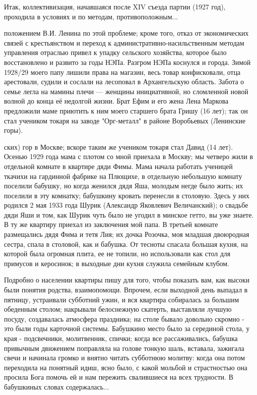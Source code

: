 \label{146-2}
Итак, коллективизация, начавшаяся после XIV съезда партии (1927 год), проходила в условиях и по методам, противоположным...

\label{147-1}
положением В.И. Ленина по этой проблеме; кроме того, отказ от экономических связей с крестьянством и переход к административно-насильственным методам управления отраслью привел к упадку сельского хозяйства, которое было восстановлено и развито за годы НЭПа. Разгром НЭПа коснулся и города. Зимой 1928/29 моего папу лишили права на магазин, весь товар конфисковали, отца арестовали, судили и сослали на лесоповал в Архангельскую область. Забота о семье легла на мамины плечи — женщины инициативной, но сломленной новой волной до конца её недолгой жизни. Брат Ефим и его жена Лена Маркова предложили маме приютить к ним моего старшего брата Гришу (16 лет); так он стал учеником токаря на заводе "Орг-металл" в районе Воробьевых (Ленинские горы).

\label{148-1}

ских) гор в Москве; вскоре таким же учеником токаря стал Давид (14 лет). Осенью 1929 года мама с плотом со мной приехала в Москву; мы четверо жили в отдельной комнате в квартире дяди Фимы. Мама начала работать ученицей ткачихи на гардинной фабрике на Плющихе, в отдельную небольшую комнату поселили бабушку, но когда женился дядя Яша, молодым негде было жить; их поселили в эту комнатку; бабушкину кровать перенесли в столовую. Здесь у них родился 2 мая 1933 года Шурик (Александр Яковлевич Величанский); о свадьбе дяди Яши и том, как Шурик чуть было не угодил в минское гетто, вы уже знаете. В ту же квартиру приехал из заключения мой папа. В третьей комнате размещались дядя Фима и тетя Лия; их дочка Розочка, моя младшая двоюродная сестра, спала в столовой, как и бабушка. От тесноты спасала большая кухня, на которой была огромная плита, ее не топили, но использовали как стол для примусов и керосинок; в выходные дни кухня служила семейным клубом.

\label{149-1}
Подробно о населении квартиры пишу для того, чтобы показать вам, как высоки были понятия родства, взаимопомощи. Впрочем, если выходной день выпадал в пятницу, устраивали субботний ужин, и вся квартира собиралась за большим обеденным столом; накрывали белоснежную скатерть, выставляли лучшую посуду, создавалась атмосфера праздника; на столе бывало довольно скромно - это были годы карточной системы. Бабушкино место было за серединой стола, у края - подсвечники, молитвенник, спички; когда все рассаживались, бабушка привычным движением поправляла на голове тонкую шаль, вставала, зажигала свечи и начинала громко и внятно читать субботнюю молитву: когда она потом переходила на понятный идиш, ясно было, с какой мольбой и страстностью она просила Бога помочь ей и нам пережить свалившиеся на всех трудности. В бабушкиных словах содержалась...

